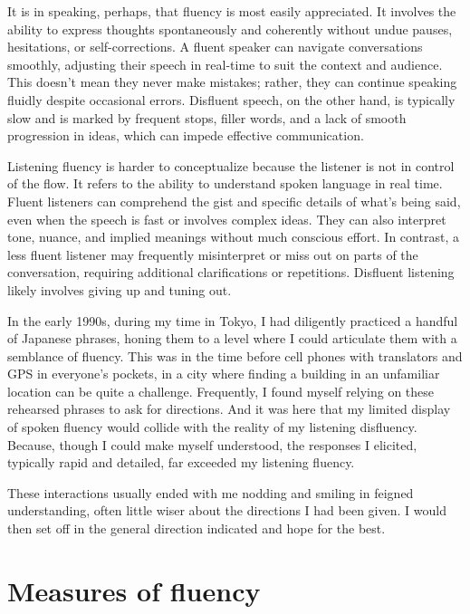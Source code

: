 It is in speaking, perhaps, that fluency is most easily appreciated. It involves the ability to express thoughts spontaneously and coherently without undue pauses, hesitations, or self-corrections. A fluent speaker can navigate conversations smoothly, adjusting their speech in real-time to suit the context and audience. This doesn't mean they never make mistakes; rather, they can continue speaking fluidly despite occasional errors. Disfluent speech, on the other hand, is typically slow and is marked by frequent stops, filler words, and a lack of smooth progression in ideas, which can impede effective communication.

Listening fluency is harder to conceptualize because the listener is not in control of the flow. It refers to the ability to understand spoken language in real time. Fluent listeners can comprehend the gist and specific details of what's being said, even when the speech is fast or involves complex ideas. They can also interpret tone, nuance, and implied meanings without much conscious effort. In contrast, a less fluent listener may frequently misinterpret or miss out on parts of the conversation, requiring additional clarifications or repetitions. Disfluent listening likely involves giving up and tuning out.

In the early 1990s, during my time in Tokyo, I had diligently practiced a handful of Japanese phrases, honing them to a level where I could articulate them with a semblance of fluency. This was in the time before cell phones with translators and GPS in everyone's pockets, in a city where finding a building in an unfamiliar location can be quite a challenge. Frequently, I found myself relying on these rehearsed phrases to ask for directions. And it was here that my limited display of spoken fluency would collide with the reality of my listening disfluency. Because, though I could make myself understood, the responses I elicited, typically rapid and detailed, far exceeded my listening fluency. 

These interactions usually ended with me nodding and smiling in feigned understanding, often little wiser about the directions I had been given. I would then set off in the general direction indicated and hope for the best.

\section{Measures of fluency}

